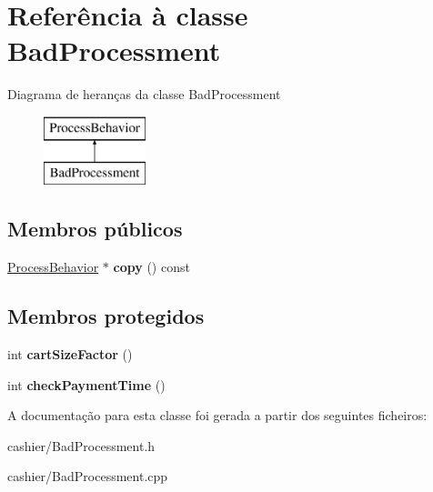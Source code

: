 \hypertarget{classBadProcessment}{\section{Referência à classe Bad\-Processment}
\label{d8/d50/classBadProcessment}
}
Diagrama de heranças da classe Bad\-Processment\begin{figure}[H]
\begin{center}
\leavevmode
\includegraphics[height=2.000000cm]{d8/d50/classBadProcessment}
\end{center}
\end{figure}
\subsection*{Membros públicos}
\begin{DoxyCompactItemize}
\item 
\hypertarget{classBadProcessment_a682870ce18151f42f864fd22ab61363f}{\hyperlink{classProcessBehavior}{Process\-Behavior} $\ast$ {\bfseries copy} () const }\label{d8/d50/classBadProcessment_a682870ce18151f42f864fd22ab61363f}

\end{DoxyCompactItemize}
\subsection*{Membros protegidos}
\begin{DoxyCompactItemize}
\item 
\hypertarget{classBadProcessment_a921c2f0f7fa59d0f92a35ddc440eeffb}{int {\bfseries cart\-Size\-Factor} ()}\label{d8/d50/classBadProcessment_a921c2f0f7fa59d0f92a35ddc440eeffb}

\item 
\hypertarget{classBadProcessment_aba28469024834d364c3d599436732204}{int {\bfseries check\-Payment\-Time} ()}\label{d8/d50/classBadProcessment_aba28469024834d364c3d599436732204}

\end{DoxyCompactItemize}


A documentação para esta classe foi gerada a partir dos seguintes ficheiros\-:\begin{DoxyCompactItemize}
\item 
cashier/Bad\-Processment.\-h\item 
cashier/Bad\-Processment.\-cpp\end{DoxyCompactItemize}
